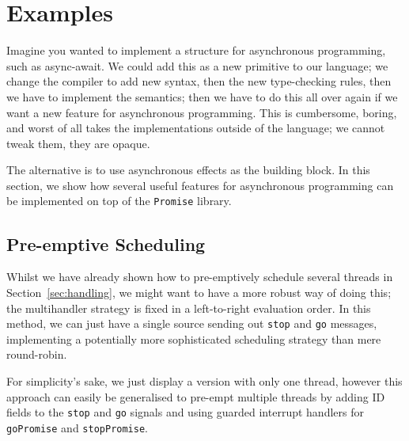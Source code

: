 \documentclass[msc,deptreport,cs]{infthesis} %
\newcommand{\code}[1]{\lstinline{#1}}
\newcommand{\todo}[1]
           {{\par\noindent\small\color{RoyalPurple}
  \framebox{\parbox{\dimexpr\linewidth-2\fboxsep-2\fboxrule}
    {\textbf{TODO:} #1}}}}
\begin{document}


\chapter{Examples}
\label{chap:examples}

Imagine you wanted to implement a structure for asynchronous programming, such
as async-await. We could add this as a new primitive to our language; we change
the compiler to add new syntax, then the new type-checking rules, then we have
to implement the semantics; then we have to do this all over again if we want a
new feature for asynchronous programming. This is cumbersome, boring, and worst
of all takes the implementations outside of the language; we cannot tweak them, they are opaque.

The alternative is to use asynchronous effects as the building block. In this
section, we show how several useful features for asynchronous programming can be implemented on top of the \code{Promise} library.



\section{Pre-emptive Scheduling}
\label{sec:pre-emptive-scheduling}

Whilst we have already shown how to pre-emptively schedule several threads in
Section~\ref{sec:handling}, we might want to have a more robust way of doing
this; the multihandler strategy is fixed in a left-to-right evaluation order. In
this method, we can just have a single source sending out \code{stop} and
\code{go} messages, implementing a potentially more sophisticated scheduling
strategy than mere round-robin.

For simplicity's sake, we just display a version with only one thread, however
this approach can easily be generalised to pre-empt multiple threads by adding
ID fields to the \code{stop} and \code{go} signals and using guarded interrupt
handlers for \code{goPromise} and \code{stopPromise}.
\end{document}
